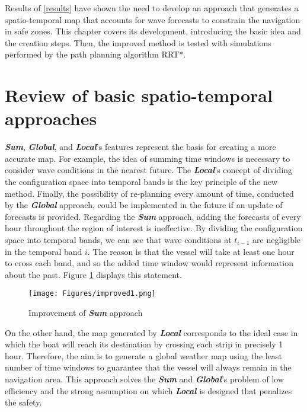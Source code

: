 \label{improvedmethod}
Results of \autoref{results} have shown the need to develop an approach that generates a spatio-temporal map that accounts for wave forecasts to constrain the navigation in safe zones.
This chapter covers its development, introducing the basic idea and the creation steps. Then, the improved method is tested with simulations performed by the path planning algorithm RRT*.

\section{Review of basic spatio-temporal approaches}
\textbf{\textit{Sum}}, \textbf{\textit{Global}}, and \textbf{\textit{Local}}'s features represent the basis for creating a more accurate map. For example, the idea of summing time windows is necessary to consider wave conditions in the nearest future. The \textbf{\textit{Local}}'s concept of dividing the configuration space into temporal bands is the key principle of the new method. Finally, the possibility of re-planning every amount of time, conducted by the \textbf{\textit{Global}} approach, could be implemented in the future if an update of forecasts is provided.
Regarding the \textbf{\textit{Sum}} approach, adding the forecasts of every hour throughout the region of interest is ineffective. By dividing the configuration space into temporal bands, we can see that wave conditions at $t_{i-1}$ are negligible in the temporal band $i$. The reason is that the vessel will take at least one hour to cross each band, and so the added time window would represent information about the past. Figure \ref{improved1} displays this statement.
\begin{figure}[H]
	\centering
	\texttt{[image: Figures/improved1.png]}
	\caption{Improvement of \textbf{\textit{Sum}} approach}
	\label{improved1}
\end{figure}

On the other hand, the map generated by \textbf{\textit{Local}} corresponds to the ideal case in which the boat will reach its destination by crossing each strip in precisely 1 hour. Therefore, the aim is to generate a global weather map using the least number of time windows to guarantee that the vessel will always remain in the navigation area. This approach solves the \textbf{\textit{Sum}} and \textbf{\textit{Global}}'s problem of low efficiency and the strong assumption on which \textbf{\textit{Local}} is designed that penalizes the safety.
